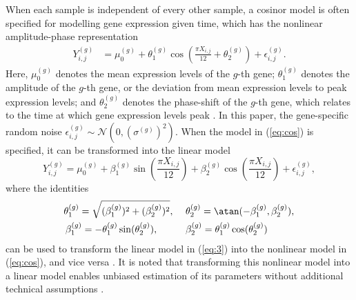 When each sample is independent of every other sample, a cosinor model is often specified for modelling gene expression given time, which has the nonlinear amplitude-phase representation
\begin{align} \label{eq:cos}
    Y^{(g)}_{i,j} &= \mu_0^{(g)} + \theta^{(g)}_1\cos\left(\frac{\pi X_{i,j}}{12} + \theta_2^{(g)}\right)+\epsilon^{(g)}_{i,j}.
\end{align}
Here, $\mu_0^{(g)}$ denotes the mean expression levels of the $g$-th gene; $\theta_1^{(g)}$ denotes the amplitude of the $g$-th gene, or the deviation from mean expression levels to peak expression levels; and $\theta_2^{(g)}$ denotes the phase-shift of the $g$-th gene, which relates to the time at which gene expression levels peak \citep{Cornelissen2014}. In this paper, the gene-specific random noise  $\epsilon_{i,j}^{(g)}\sim \mathcal{N}(0, (\sigma^{(g)})^2)$. When the model in (\ref{eq:cos}) is specified, it can be transformed into the linear model
\begin{equation} \label{eq:3}
    Y^{(g)}_{i,j} = \mu_0^{(g)} + \beta^{(g)}_1\sin\left(\frac{\pi X_{i,j}}{12}\right)+\beta^{(g)}_2\cos\left(\frac{\pi X_{i,j}}{12}\right) + \epsilon^{(g)}_{i,j},
\end{equation}
where the identities
\begin{align}
    \theta_1^{(g)} = \sqrt{(\beta^{(g)}_{1})^2+(\beta^{(g)}_{2})^2}, \ \quad & \theta_2^{(g)} = \atan(-\beta^{(g)}_{1}, \beta^{(g)}_{2}), \nonumber \\
    \beta^{(g)}_{1} = -\theta_1^{(g)}\sin(\theta_2^{(g)}), \quad \quad \quad  & \beta^{(g)}_{2} = \theta_1^{(g)}\cos(\theta_2^{(g)}) \label{eq:alt_to_orig}
\end{align}
can be used to transform the linear model in (\ref{eq:3}) into the nonlinear model in (\ref{eq:cos}), and vice versa \citep{Tong1976}. It is noted that transforming this nonlinear model into a linear model enables unbiased estimation of its parameters without additional technical assumptions \citep[Theorem 6.7]{Boos2013}.

